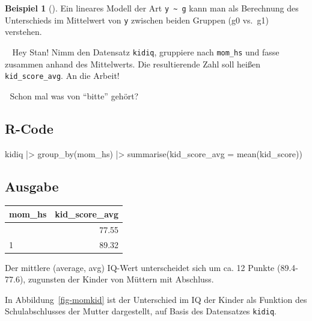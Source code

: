 \documentclass[
  ngerman,
  letterpaper,
  twoside,
  open=any]{scrbook}
\newenvironment{Shaded}{\begin{snugshade}}{\end{snugshade}}
\newcommand{\AttributeTok}[1]{\textcolor[rgb]{0.40,0.45,0.13}{#1}}
\newcommand{\FunctionTok}[1]{\textcolor[rgb]{0.28,0.35,0.67}{#1}}
\newcommand{\NormalTok}[1]{\textcolor[rgb]{0.00,0.23,0.31}{#1}}
\newcommand{\SpecialCharTok}[1]{\textcolor[rgb]{0.37,0.37,0.37}{#1}}
\newcounter{none} %
\theoremstyle{definition}
\newtheorem{example}{Beispiel}[chapter]
\theoremstyle{plain}
\theoremstyle{definition}
\theoremstyle{definition}
\theoremstyle{remark}
\begin{document}
\begin{example}[]
Ein lineares Modell der Art \texttt{y\ \textasciitilde{}\ g} kann man
als Berechnung des Unterschieds im Mittelwert von \texttt{y} zwischen
beiden Gruppen (g0 vs.~g1) verstehen.

\begin{displayquote}
👨🏫 Hey Stan! Nimm den Datensatz \texttt{kidiq}, gruppiere nach
\texttt{mom\_hs} und fasse zusammen anhand des Mittelwerts. Die
resultierende Zahl soll heißen \texttt{kid\_score\_avg}. An die Arbeit!
\end{displayquote}

\begin{displayquote}
🤖 Schon mal was von \enquote{bitte} gehört?
\end{displayquote}

\subsection{R-Code}

\begin{Shaded}
\begin{Highlighting}[]
\NormalTok{kidiq }\SpecialCharTok{|\textgreater{}} 
  \FunctionTok{group\_by}\NormalTok{(mom\_hs) }\SpecialCharTok{|\textgreater{}} 
  \FunctionTok{summarise}\NormalTok{(}\AttributeTok{kid\_score\_avg =} 
              \FunctionTok{mean}\NormalTok{(kid\_score))}
\end{Highlighting}
\end{Shaded}

\subsection{Ausgabe}

{\def\LTcaptype{none} %
\begin{longtable}[]{@{}lr@{}}
\toprule\noalign{}
mom\_hs & kid\_score\_avg \\
\midrule\noalign{}
\endhead
\bottomrule\noalign{}
\endlastfoot
0 & 77.55 \\
1 & 89.32 \\
\end{longtable}
}

Der mittlere (average, avg) IQ-Wert unterscheidet sich um ca. 12 Punkte
(89.4-77.6), zugunsten der Kinder von Müttern mit Abschluss.

In Abbildung~\ref{fig-momkid} ist der Unterschied im IQ der Kinder als
Funktion des Schulabschlusses der Mutter dargestellt, auf Basis des
Datensatzes \texttt{kidiq}.


\end{example}
\end{document}
